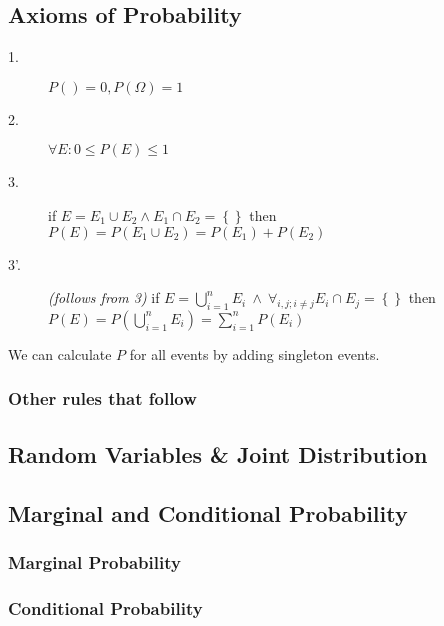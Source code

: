 \subsection{Axioms of Probability}
\begin{description}
	\item[1.] $P({}) = 0, P(\Omega) = 1$
  \item[2.] $\forall E: 0 \leq P(E) \leq 1$
  \item[3.] if $E = E_1 \cup E_2 \wedge E_1 \cap E_2 = \left\{ \right\}$ 
            then $P(E) = P(E_1 \cup E_2) = P(E_1) + P(E_2)$
  \item[3'.] \textit{(follows from 3)} 
            if $E = \bigcup_{i=1}^n E_i \  \wedge \ \forall_{i, j; i \neq j} E_i \cap E_j = \left\{ \right\}$
            then $P(E) = P(\bigcup_{i=1}^n E_i) = \sum_{i=1}^{n}{P(E_i)}$
\end{description}

We can calculate $P$ for all events by adding singleton events.

\subsubsection*{Other rules that follow}


\subsection{Random Variables \& Joint Distribution}


\subsection{Marginal and Conditional Probability}


\subsubsection*{Marginal Probability}


\subsubsection*{Conditional Probability}